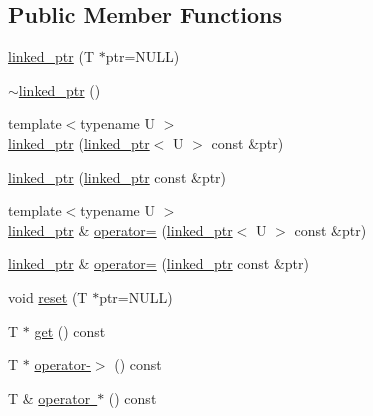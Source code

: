 \subsection*{Public Member Functions}
\begin{DoxyCompactItemize}
\item 
\mbox{\hyperlink{classtesting_1_1internal_1_1linked__ptr_ae805418b9f03f14ff49649e710475dba}{linked\+\_\+ptr}} (T $\ast$ptr=N\+U\+LL)
\item 
\mbox{\hyperlink{classtesting_1_1internal_1_1linked__ptr_af99460fd09ca0f83e061ea480ef1a45e}{$\sim$linked\+\_\+ptr}} ()
\item 
{\footnotesize template$<$typename U $>$ }\\\mbox{\hyperlink{classtesting_1_1internal_1_1linked__ptr_a7597ed91006edd0467c99bd1aaab07f5}{linked\+\_\+ptr}} (\mbox{\hyperlink{classtesting_1_1internal_1_1linked__ptr}{linked\+\_\+ptr}}$<$ U $>$ const \&ptr)
\item 
\mbox{\hyperlink{classtesting_1_1internal_1_1linked__ptr_abc076b5678cc7f64306d5ecfefc93aff}{linked\+\_\+ptr}} (\mbox{\hyperlink{classtesting_1_1internal_1_1linked__ptr}{linked\+\_\+ptr}} const \&ptr)
\item 
{\footnotesize template$<$typename U $>$ }\\\mbox{\hyperlink{classtesting_1_1internal_1_1linked__ptr}{linked\+\_\+ptr}} \& \mbox{\hyperlink{classtesting_1_1internal_1_1linked__ptr_a82608d98869b750d9ab729f1450a9a45}{operator=}} (\mbox{\hyperlink{classtesting_1_1internal_1_1linked__ptr}{linked\+\_\+ptr}}$<$ U $>$ const \&ptr)
\item 
\mbox{\hyperlink{classtesting_1_1internal_1_1linked__ptr}{linked\+\_\+ptr}} \& \mbox{\hyperlink{classtesting_1_1internal_1_1linked__ptr_a1f40b5e66e6cf7b661ea116c806f952e}{operator=}} (\mbox{\hyperlink{classtesting_1_1internal_1_1linked__ptr}{linked\+\_\+ptr}} const \&ptr)
\item 
void \mbox{\hyperlink{classtesting_1_1internal_1_1linked__ptr_a95ba3b7b66ed0193c779976c6e126ab6}{reset}} (T $\ast$ptr=N\+U\+LL)
\item 
T $\ast$ \mbox{\hyperlink{classtesting_1_1internal_1_1linked__ptr_a0c2ba99eb3521806f83f5c4435465ce0}{get}} () const
\item 
T $\ast$ \mbox{\hyperlink{classtesting_1_1internal_1_1linked__ptr_a23ff85ac97eed03e945034b65c8eb900}{operator-\/$>$}} () const
\item 
T \& \mbox{\hyperlink{classtesting_1_1internal_1_1linked__ptr_afb4cb23e6c68c284b87d20b21a12285a}{operator $\ast$}} () const

\end{DoxyCompactItemize}

